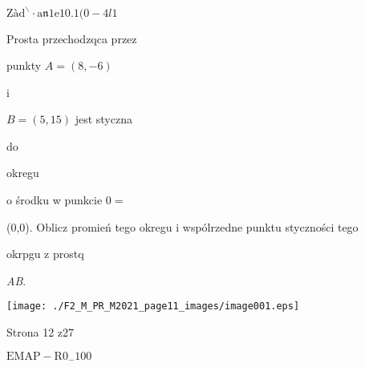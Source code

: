 \documentclass[a4paper,12pt]{article}
\begin{document}
$\mathrm{Z}\text{à} \mathrm{d}^{\backslash }\cdot \mathrm{a}\mathfrak{n}1\mathrm{e}10. 1(0-4l1$

Prosta przechodzqca przez

punkty $A = (8,-6)$

i

$B = (5,15)$ jest styczna

do

okregu

o środku w punkcie $0 =$

(0,0). Oblicz promień tego okregu i wspólrzedne punktu styczności tego

okrpgu z prostq

{\it AB}.
\begin{center}
\texttt{[image: ./F2\_M\_PR\_M2021\_page11\_images/image001.eps]}
\end{center}
Strona 12 z27

$\mathrm{E}\mathrm{M}\mathrm{A}\mathrm{P}-\mathrm{R}0_{-}100$
\end{document}
